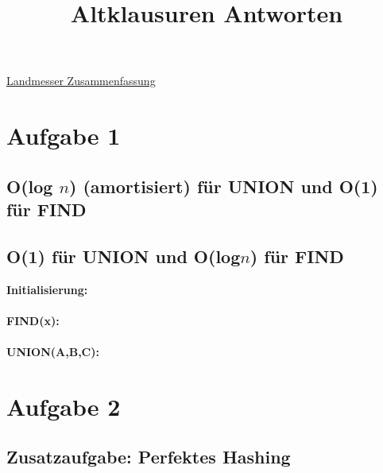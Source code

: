 \documentclass[10pt,a4paper]{article}
\title{Altklausuren Antworten}
\date{}
\begin{document}
\maketitle
\href{https://github.com/ofenstichloch/Uni/blob/master/Kapitel\%20ADS/VL.pdf}{Landmesser Zusammenfassung}
\section*{Aufgabe 1}
\subsection*{O(log $n$) (amortisiert) für UNION und O(1) für FIND}
\subsection*{O(1) für UNION und O(log$n$) für FIND}
\begin{algorithm}
	\textbf{Initialisierung:}	\\
	~\\
	\textbf{FIND(x):} \\
	~\\
	
	\textbf{UNION(A,B,C):} \\
	
\end{algorithm}


\section*{Aufgabe 2}
\subsection*{Zusatzaufgabe: Perfektes Hashing}
\end{document}
